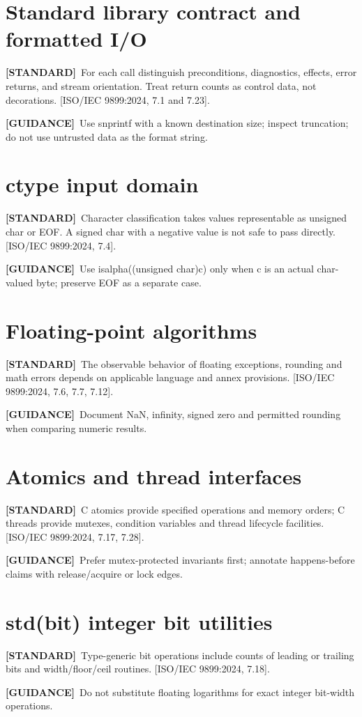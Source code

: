 \documentclass[10pt,letterpaper,oneside]{report}
\newcommand{\refcl}[1]{\textsf{\footnotesize[ISO/IEC 9899:2024, #1]}}
\newcommand{\standard}{\textbf{[STANDARD]}}
\newcommand{\guidance}{\textbf{[GUIDANCE]}}
\begin{document}
\section{Standard library contract and formatted I/O}
\standard\ For each call distinguish preconditions, diagnostics, effects, error returns, and stream orientation. Treat return counts as control data, not decorations. \refcl{7.1 and 7.23}.\par\guidance\ Use snprintf with a known destination size; inspect truncation; do not use untrusted data as the format string.

\section{ctype input domain}
\standard\ Character classification takes values representable as unsigned char or EOF. A signed char with a negative value is not safe to pass directly. \refcl{7.4}.\par\guidance\ Use isalpha((unsigned char)c) only when c is an actual char-valued byte; preserve EOF as a separate case.

\section{Floating-point algorithms}
\standard\ The observable behavior of floating exceptions, rounding and math errors depends on applicable language and annex provisions. \refcl{7.6, 7.7, 7.12}.\par\guidance\ Document NaN, infinity, signed zero and permitted rounding when comparing numeric results.

\section{Atomics and thread interfaces}
\standard\ C atomics provide specified operations and memory orders; C threads provide mutexes, condition variables and thread lifecycle facilities. \refcl{7.17, 7.28}.\par\guidance\ Prefer mutex-protected invariants first; annotate happens-before claims with release/acquire or lock edges.

\section{std(bit) integer bit utilities}
\standard\ Type-generic bit operations include counts of leading or trailing bits and width/floor/ceil routines. \refcl{7.18}.\par\guidance\ Do not substitute floating logarithms for exact integer bit-width operations.
\end{document}
